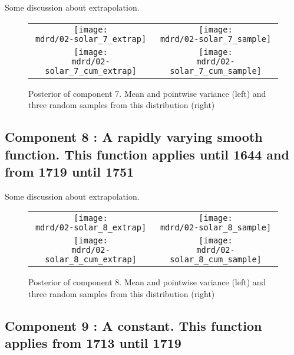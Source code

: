 \documentclass{article} %
\begin{document}
Some discussion about extrapolation.

\begin{figure}[H]
\newcommand{\wmgd}{0.5\columnwidth}
\newcommand{\hmgd}{3.0cm}
\newcommand{\mdrd}{figures/02-solar}
\newcommand{\mbm}{\hspace{-0.3cm}}
\begin{tabular}{cc}
\mbm \texttt{[image: \\mdrd/02-solar\_7\_extrap]} & \texttt{[image: \\mdrd/02-solar\_7\_sample]} \\
\mbm \texttt{[image: \\mdrd/02-solar\_7\_cum\_extrap]} & \texttt{[image: \\mdrd/02-solar\_7\_cum\_sample]}
\end{tabular}
\caption{Posterior of component 7. Mean and pointwise variance (left) and three random samples from this distribution (right)}
\label{fig:extrap7}
\end{figure}

\subsection{Component 8 : A rapidly varying smooth function. This function applies until 1644 and from 1719 until 1751}

Some discussion about extrapolation.

\begin{figure}[H]
\newcommand{\wmgd}{0.5\columnwidth}
\newcommand{\hmgd}{3.0cm}
\newcommand{\mdrd}{figures/02-solar}
\newcommand{\mbm}{\hspace{-0.3cm}}
\begin{tabular}{cc}
\mbm \texttt{[image: \\mdrd/02-solar\_8\_extrap]} & \texttt{[image: \\mdrd/02-solar\_8\_sample]} \\
\mbm \texttt{[image: \\mdrd/02-solar\_8\_cum\_extrap]} & \texttt{[image: \\mdrd/02-solar\_8\_cum\_sample]}
\end{tabular}
\caption{Posterior of component 8. Mean and pointwise variance (left) and three random samples from this distribution (right)}
\label{fig:extrap8}
\end{figure}

\subsection{Component 9 : A constant. This function applies from 1713 until 1719}
\end{document}
